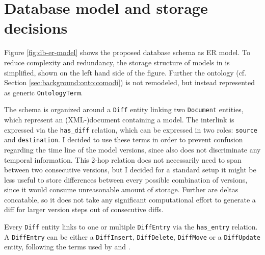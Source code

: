 \section{Database model and storage decisions}
\label{sec:concept:dbmodel}

Figure \ref{fig:db-er-model} shows the proposed database schema as ER model. To reduce complexity and redundancy, the storage structure of models in \masymos is simplified, shown on the left hand side of the figure. Further the \comodi ontology (cf. Section \ref{sec:background:onto:comodi}) is not remodeled, but instead represented as generic \texttt{OntologyTerm}.


The schema is organized around a \texttt{Diff} entity linking two \texttt{Document} entities, which represent an (XML-)document containing a model. The interlink is expressed via the \texttt{has\_diff} relation, which can be expressed in two roles: \texttt{source} and \texttt{destination}. I decided to use these terms in order to prevent confusion regarding the time line of the model versions, since \bives also does not discriminate any temporal information.
This 2-hop relation does not necessarily need to span between two consecutive versions, but I decided for a standard setup it might be less useful to store differences between every possible combination of versions, since it would consume unreasonable amount of storage. Further are deltas concatable, so it does not take any significant computational effort to generate a diff for larger version steps out of consecutive diffs.

Every \texttt{Diff} entity links to one or multiple \texttt{DiffEntry} via the \texttt{has\_entry} relation.  
A \texttt{DiffEntry} can be either a \texttt{DiffInsert},  \texttt{DiffDelete}, \texttt{DiffMove} or a \texttt{DiffUpdate} entity, following the terms used by \bives \cite{Scharm2015} and \comodi \cite{Scharm2016}.

